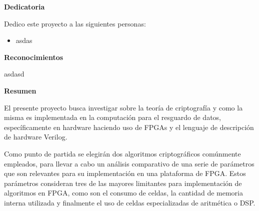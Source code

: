 \begin{center}\huge{\textbf{Dedicatoria}}\end{center}

Dedico este proyecto a las siguientes personas:
\begin{itemize} 
\item asdas
\end{itemize}

\cleardoublepage

\begin{center}\huge{\textbf{Reconocimientos}}\end{center}
asdasd
\cleardoublepage

\begin{center}\huge{\textbf{Resumen}}\end{center}


El presente proyecto busca investigar sobre la teoría de criptografía y como la misma es implementada en la computación para el resguardo de datos, específicamente en hardware haciendo uso de FPGAs y el lenguaje de descripción de hardware Verilog. 

Como punto de partida se elegirán dos algoritmos criptográficos comúnmente empleados, para llevar a cabo un análisis comparativo de una serie de parámetros que son relevantes para su implementación en una plataforma de FPGA. Estos parámetros consideran tres de las mayores limitantes para implementación de algoritmos en FPGA, como son el consumo de celdas, la cantidad de memoria interna utilizada y finalmente el uso de celdas especializadas de aritmética o DSP.
